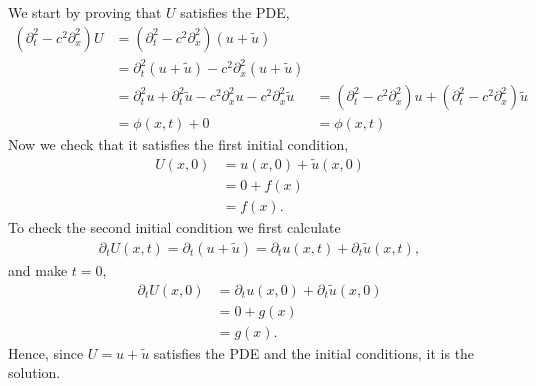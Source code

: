 \begin{questions}
\begin{solution}
We start by proving that $U$ satisfies the PDE,
\begin{align*}
(\partial_t^2-c^2\partial_x^2)U&=(\partial_t^2-c^2\partial_x^2)(u+\tilde{u})\\
&=\partial_t^2(u+\tilde{u})-c^2\partial_x^2(u+\tilde{u})\\
&=\partial_t^2u+\partial_t^2\tilde{u}-c^2\partial_x^2u-c^2\partial_x^2\tilde{u}
&=(\partial_t^2-c^2\partial_x^2)u+(\partial_t^2-c^2\partial_x^2)\tilde{u}\\
&=\phi(x,t)+0
&=\phi(x,t)
\end{align*}
Now we check that it satisfies the first initial condition,
\begin{align*}
U(x,0)&=u(x,0)+\tilde{u}(x,0)\\
&=0+f(x)\\
&=f(x).
\end{align*}
To check the second initial condition we first calculate
\begin{align*}
\partial_tU(x,t)=\partial_t(u+\tilde{u})=\partial_tu(x,t)+\partial_t\tilde{u}(x,t),
\end{align*}
and make $t=0$,
\begin{align*}
\partial_tU(x,0)&=\partial_tu(x,0)+\partial_t\tilde{u}(x,0)\\
&=0+g(x)\\
&=g(x).
\end{align*}
Hence, since $U=u+\tilde{u}$ satisfies the PDE and the initial conditions, it is the solution.
\end{solution}

\end{questions}